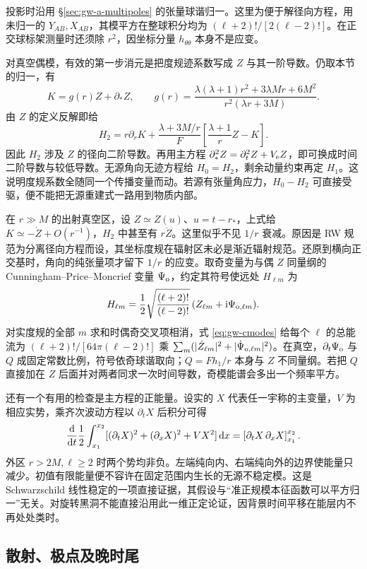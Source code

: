 投影时沿用 \S\ref{sec:gw-a-multipoles} 的张量球谐归一。这里为便于解径向方程，用未归一的 $Y_{AB},X_{AB}$，其模平方在整球积分均为 $(\ell+2)!/[2(\ell-2)!]$。在正交球标架测量时还须除 $r^2$，因坐标分量 $h_{\theta\theta}$ 本身不是应变。

对真空偶模，有效的第一步消元是把度规迹系数写成 $Z$ 与其一阶导数。仍取本节的归一，有
\[
 K=g(r)Z+\partial_* Z,\qquad
 g(r)=\frac{\lambda(\lambda+1)r^2+3\lambda Mr+6M^2}
                  {r^2(\lambda r+3M)} .
\]
由 $Z$ 的定义反解即给
\[
 H_2=r\partial_r K+\frac{\lambda+3M/r}{F}
           \left[\frac{\lambda+1}{r}Z-K\right].
\]
因此 $H_2$ 涉及 $Z$ 的径向二阶导数。再用主方程 $\partial_*^2 Z=\partial_t^2 Z+V_{\rm e}Z$，即可换成时间二阶导数与较低导数。无源角向无迹方程给 $H_0=H_2$，剩余动量约束再定 $H_1$。这说明度规系数全随同一个传播变量而动。若源有张量角应力，$H_0-H_2$ 可直接受驱，便不能把无源重建式一路用到物质内部。

在 $r\gg M$ 的出射真空区，设 $Z\simeq Z(u)$、$u=t-r_*$，上式给 $K\simeq-\dot Z+O(r^{-1})$，$H_2$ 中甚至有 $r\ddot Z$。这里似乎不见 $1/r$ 衰减。原因是 RW 规范为分离径向方程而设，其坐标度规在辐射区未必是渐近辐射规范。还原到横向正交基时，角向的纯张量项才留下 $1/r$ 的应变。取奇变量为与偶 $Z$ 同量纲的 Cunningham--Price--Moncrief 变量 $\Psi_{\rm o}$，约定其符号使远处 $H_{\ell m}$ 为
\[
 H_{\ell m}=\frac12\sqrt{\frac{(\ell+2)!}{(\ell-2)!}}\,
             (Z_{\ell m}+\mathrm i\Psi_{{\rm o},\ell m}).
\]
对实度规的全部 $m$ 求和时偶奇交叉项相消，式 \eqref{eq:gw-cmodes} 给每个 $\ell$ 的总能流为 $(\ell+2)!/[64\pi(\ell-2)!]$ 乘 $\sum_m(|\dot Z_{\ell m}|^2+|\dot\Psi_{{\rm o},\ell m}|^2)$。在真空，$\partial_t\Psi_{\rm o}$ 与 $Q$ 成固定常数比例，符号依奇球谐取向；$Q=Fh_1/r$ 本身与 $Z$ 不同量纲。若把 $Q$ 直接加在 $Z$ 后面并对两者同求一次时间导数，奇模能谱会多出一个频率平方。

还有一个有用的检查是主方程的正能量。设实的 $X$ 代表任一宇称的主变量，$V$ 为相应实势，乘齐次波动方程以 $\partial_t X$ 后积分可得
\[
 \frac{\dd}{\dd t}\frac12\int_{x_1}^{x_2}
  [(\partial_tX)^2+(\partial_xX)^2+V X^2]\,\dd x
    =\left[\partial_t X\,\partial_x X\right]_{x_1}^{x_2}.
\]
外区 $r>2M,\ell\ge2$ 时两个势均非负。左端纯向内、右端纯向外的边界使能量只减少。初值有限能量便不容许在固定范围内生长的无源不稳定模。这是 Schwarzschild 线性稳定的一项直接证据，其假设与“准正规模本征函数可以平方归一”无关。对旋转黑洞不能直接沿用此一维正定论证，因背景时间平移在能层内不再处处类时。

\subsection{散射、极点及晚时尾}

